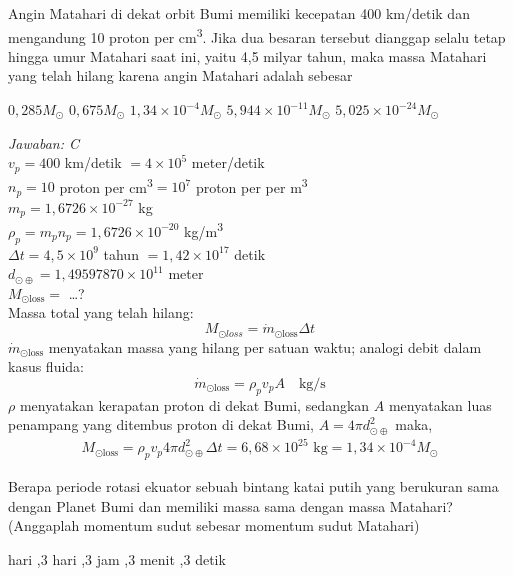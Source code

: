 \documentclass[11pt,fleqn]{exam}
\begin{document}
\begin{questions}
\question Angin Matahari di dekat orbit Bumi memiliki kecepatan 400 km/detik dan mengandung 10 proton per cm\textsuperscript{3}. Jika dua besaran tersebut dianggap selalu tetap hingga umur Matahari saat ini,  yaitu 4,5 milyar tahun, maka massa Matahari yang telah hilang karena angin Matahari adalah sebesar
\begin{choices}
\choice $0,285 M_{\odot}$
\choice $0,675 M_{\odot}$
\choice $1,34\times 10^{-4} M_{\odot}$
\choice $5,944\times 10^{-11} M_{\odot}$
\choice $5,025\times 10^{-24} M_{\odot}$
\end{choices}

\textit{Jawaban: C}\\
$v_p=400$ km/detik $=4\times10^5$ meter/detik\\
$n_p=10$ proton per cm\textsuperscript{3}$= 10^{7}$ proton per per m\textsuperscript{3}\\
$m_p=1,6726\times 10^{-27}$ kg\\
$\rho_p=m_p n_p=1,6726\times 10^{-20}$ kg/m\textsuperscript{3}\\
$\Delta t=4,5\times 10^9$ tahun $=1,42\times 10^{17}$ detik\\
$d_{\odot\oplus}=1,49597870\times10^{11}$ meter\\
$M_{\odot \text{loss}}=$ \ldots ?\\

Massa total yang telah hilang:
$$M_{\odot loss}=\dot{m}_{\odot \text{loss}}\Delta t$$ 
$\dot{m}_{\odot \text{loss}}$ menyatakan massa yang hilang per satuan waktu; analogi debit dalam kasus fluida:
$$\dot{m}_{\odot \text{loss}}=\rho_p v_p A \quad \text{kg/s}$$
$\rho$ menyatakan kerapatan proton di dekat Bumi, sedangkan $A$ menyatakan luas penampang yang ditembus proton di dekat Bumi, $A=4\pi d_{\odot\oplus}^2$
maka,
\begin{eqnarray*}
M_{\odot \text{loss}} = \rho_p v_p 4\pi d_{\odot\oplus}^2 \Delta t = 6,68\times 10^{25} \text{  kg} = 1,34\times 10^{-4}M_{\odot}
\end{eqnarray*}


\vspace{0.3cm}
\question Berapa periode rotasi ekuator sebuah bintang katai putih yang berukuran sama dengan Planet Bumi dan memiliki massa sama dengan massa Matahari? (Anggaplah momentum sudut sebesar momentum sudut Matahari)
\begin{choices}
 hari
,3 hari
,3 jam
,3 menit
,3 detik
\end{choices}


\end{questions}
\end{document}
